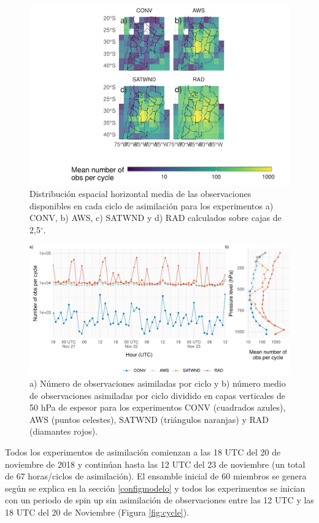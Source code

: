 \documentclass[12pt,oneside,a4paper]{reedthesis}
\begin{document}
\begin{figure}
\includegraphics{thesis_files/figure-latex/obs-horizontal-1} \caption{Distribución espacial horizontal media de las observaciones disponibles en cada ciclo de asimilación para los experimentos a) CONV, b) AWS, c) SATWND y d) RAD calculados sobre cajas de 2,5\(^{\circ}\).}\label{fig:obs-horizontal}
\end{figure}

\begin{figure}
\includegraphics{thesis_files/figure-latex/obs-cycle-1} \caption{a) Número de observaciones asimiladas por ciclo y b) número medio de observaciones asimiladas por ciclo dividido en capas verticales de 50 hPa de espesor para los experimentos CONV (cuadrados azules), AWS (puntos celestes), SATWND (triángulos naranjas) y RAD (diamantes rojos).}\label{fig:obs-cycle}
\end{figure}
Todos los experimentos de asimilación comienzan a las 18 UTC del 20 de noviembre de 2018 y continúan hasta las 12 UTC del 23 de noviembre (un total de 67 horas/ciclos de asimilación). El ensamble inicial de 60 miembros se genera según se explica en la sección \ref{configmodelo} y todos los experimentos se inician con un periodo de spin up sin asimilación de observaciones entre las 12 UTC y las 18 UTC del 20 de Noviembre (Figura \ref{fig:cycle}).
\end{document}
